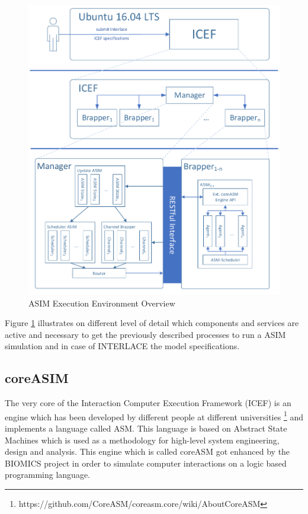 \begin{figure}[htbp]
  \centering
  \includegraphics[width=1.0\textwidth, clip, trim=1mm 1mm 1mm 1mm]{Figures/environment_asim}
  \caption{ASIM Execution Environment Overview}
  \label{fig:icef-intro-asim}
\end{figure}

Figure \ref{fig:icef-intro-asim} illustrates on different level of detail which components and services are active and necessary to get the previously described processes to run a ASIM simulation and in case of INTERLACE the model specifications.

\subsection{coreASIM}
\label{sec:coreasim-details}

The very core of the Interaction Computer Execution Framework (ICEF) is an engine which has been developed by different people at different universities \footnote{https://github.com/CoreASM/coreasm.core/wiki/About\-CoreASM} and implements a language called ASM. This language is based on Abstract State Machines \cite{BoergerStaerk2003} which is used as a methodology for high-level system engineering, design and analysis. This engine which is called coreASM got enhanced by the BIOMICS project in order to simulate computer interactions on a logic based programming language.

